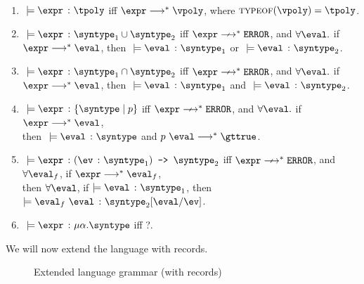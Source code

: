 \begin{definition}
  \label{def_typingRulesExt}
  \ \par
  \begin{enumerate}
      \item $\ \models \hastype{\expr}{\tpoly}$ iff $\expr \smallsteps[] \vpoly$, where $\textsc{typeof}(\vpoly) = \tpoly$.
      \item $\ \models \hastype{\expr}{\mkunion{\syntype_1}{\syntype_2}}$ iff $\expr \nsmallsteps[] \eerror$, and $\forall \eval.$ if $\expr \smallsteps[] \eval$, then $\ \models \hastype{\eval}{\syntype_1}$ or $\ \models \hastype{\eval}{\syntype_2}$.
      \item $\ \models \hastype{\expr}{\mkintersect{\syntype_1}{\syntype_2}}$ iff $\expr \nsmallsteps[] \eerror$, and $\forall \eval.$ if $\expr \smallsteps[] \eval$, then $\ \models \hastype{\eval}{\syntype_1}$ and $\ \models \hastype{\eval}{\syntype_2}$.
      \item $\ \models \hastype{\expr}{\mktset{\syntype}{p}}$ iff $\expr \nsmallsteps[] \eerror$, and $\forall \eval.$ if $\expr \smallsteps[] \eval$, \\ then $\ \models \hastype{\eval}{\syntype}$ and $p \ \eval \smallsteps[] \gttrue$.
      \item $\ \models \hastype{\expr}{\mkdfun{\ev}{\syntype_1}{\syntype_2}}$ iff $\expr \nsmallsteps[] \eerror$, and $\forall{\eval_f}$, if $\expr \smallsteps[] \eval_f$, \\ then $\forall \eval$, if $\models \hastype{\eval}{\syntype_1}$, then $\models \hastype{\eval_f\ \eval}{\substitute{\syntype_2}{\eval}{\ev}}$.
      \item $\ \models \hastype{\expr}{\mkmiu{\alpha}{\syntype}}$ iff ?.
  \end{enumerate}
\end{definition}

We will now extend the language with records.


\begin{figure}[hbt!]%
  \begin{grammar}
            \grule[values]{\eval}{
              \cdots
              \gor \{\overline{\elbl = \eval}\}^{\{\overline{\elbl}\}}
            }
            \grule[types]{\syntype}{
              \cdots
              \gor \{\overline{\hastype{\elbl}{\syntype}}\} 
          }
        \end{grammar}
    \caption{Extended language grammar (with records)}
    \label{rec_Grammar}
\end{figure}

